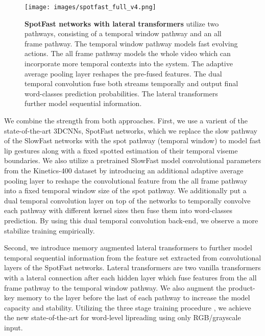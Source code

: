 \documentclass{article}
\begin{document}
\begin{figure}[t] \label{fig1}
\begin{center}
   \texttt{[image: images/spotfast\_full\_v4.png]}
\end{center}
\vspace{-1\baselineskip}
   \caption{\textbf{SpotFast networks with lateral transformers} utilize two pathways, consisting of a temporal window pathway and an all frame pathway. The temporal window pathway models fast evolving actions. The all frame pathway models the whole video which can incorporate more temporal contexts into the system. The adaptive average pooling layer reshapes the pre-fused features. The dual temporal convolution fuse both streams temporally and output final word-classes prediction probabilities. The lateral transformers  further model sequential information.}
\label{fig:long}
\label{fig:onecol}
\vspace{-1\baselineskip}
\end{figure}

We combine the strength from both approaches. First, we use a varient of the state-of-the-art 3DCNNs, SpotFast networks, which we replace the slow pathway of the SlowFast networks \cite{feichtenhofer2019slowfast} with the spot pathway (temporal window) to model fast lip gestures along with a fixed spotted estimation of their temporal viseme boundaries. We also utilize a pretrained SlowFast model convolutional parameters from the Kinetics-400 dataset \cite{carreira2017quo} by introducing an additional adaptive average pooling layer to reshape the convolutional feature from the all frame pathway into a fixed temporal window size of the spot pathway. We additionally put a dual temporal convolution layer on top of the networks to temporally convolve each pathway with different kernel sizes then fuse them into word-classes prediction. By using this dual temporal convolution back-end, we observe a more stabilize training empirically. 

Second, we introduce memory augmented lateral transformers to further model temporal sequential information from the feature set extracted from convolutional layers of the SpotFast networks. Lateral transformers are two vanilla transformers with a lateral connection after each hidden layer which fuse features from the all frame pathway to the temporal window pathway. We also augment the product-key memory \cite{lample2019large} to the layer before the last of each pathway to increase the model capacity and stability. Utilizing the three stage training procedure \cite{petridis2017end}, we achieve the new state-of-the-art for word-level lipreading using only RGB/grayscale input.
\end{document}
